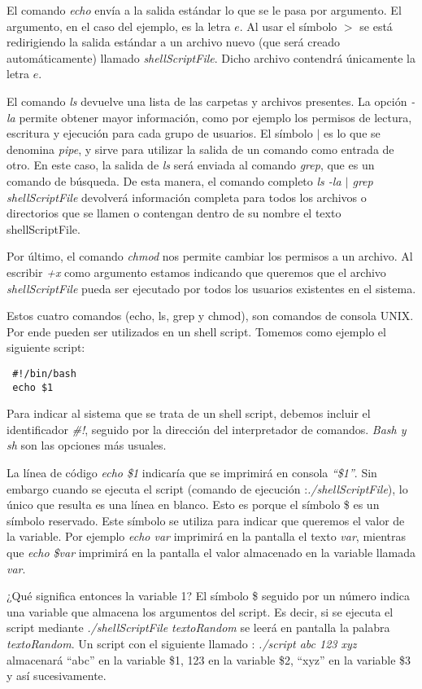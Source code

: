 El comando \textit{echo} envía a la salida estándar lo que se le pasa por argumento. El argumento, en el caso del ejemplo, es la letra $e$.
Al usar el símbolo $>$ se está redirigiendo la salida estándar a un archivo nuevo (que será creado automáticamente) llamado \textit{shellScriptFile}. Dicho archivo contendrá únicamente la letra $e$.

El comando \textit{ls} devuelve una lista de las carpetas y archivos presentes. La opción \textit{-la} permite obtener mayor información, como por ejemplo los permisos de lectura, escritura y ejecución para cada grupo de usuarios. El símbolo $|$ es lo que se denomina \textit{pipe}, y sirve para utilizar la salida de un comando como entrada de otro. En este caso, la salida de \textit{ls} será enviada al comando \textit{grep}, que es un comando de búsqueda. De esta manera, el comando completo \textit{ls -la $|$ grep shellScriptFile} devolverá información completa para todos los archivos o directorios que se llamen o contengan dentro de su nombre el texto shellScriptFile.

Por último, el comando \textit{chmod} nos permite cambiar los permisos a un archivo. Al escribir \textit{+x} como argumento estamos indicando que queremos que el archivo \textit{shellScriptFile} pueda ser ejecutado por todos los usuarios existentes en el sistema.

Estos cuatro comandos (echo, ls, grep y chmod), son comandos de consola UNIX. Por ende pueden ser utilizados en un shell script. Tomemos como ejemplo el siguiente script:
\begin{lstlisting}
 #!/bin/bash
 echo $1
\end{lstlisting}

Para indicar al sistema que se trata de un shell script, debemos incluir el identificador \textit{\#!}, seguido por la dirección del interpretador de comandos. \textit{Bash y sh} son las opciones más usuales. 

La línea de código \textit{echo \$1} indicaría que se imprimirá en consola \textit{``\$1''}. Sin embargo cuando se ejecuta el script (comando de ejecución :\textit{./shellScriptFile}), lo único que resulta es una línea en blanco.  Esto es porque el símbolo \$ es un símbolo reservado. Este símbolo se utiliza para indicar que queremos el valor de la variable. Por ejemplo \textit{echo var} imprimirá en la pantalla el texto \textit{var}, mientras que \textit{echo \$var} imprimirá en la pantalla el valor almacenado en la variable llamada \textit{var}.

¿Qué significa entonces la variable 1? El símbolo \$ seguido por un número indica una variable que almacena los argumentos del script. Es decir, si se ejecuta el script mediante \textit{./shellScriptFile textoRandom} se leerá en pantalla la palabra \textit{textoRandom}. Un script con el siguiente llamado : \textit{./script abc 123 xyz} almacenará ``abc'' en la variable \$1, 123 en la variable \$2, ``xyz'' en la variable \$3 y así sucesivamente.

